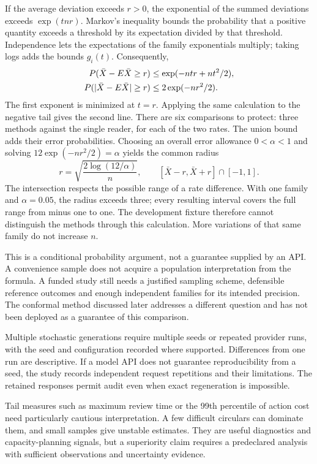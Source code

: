 If the average deviation exceeds $r>0$, the exponential of the summed deviations
exceeds $\exp(tnr)$. Markov's inequality bounds the probability that a positive
quantity exceeds a threshold by its expectation divided by that threshold.
Independence lets the expectations of the family exponentials multiply; taking
logs adds the bounds $g_i(t)$. Consequently,
\begin{align}
 P(\bar X-E\bar X\geq r)
 &\leq \exp(-ntr+nt^2/2),\notag\\
 P(|\bar X-E\bar X|\geq r)
 &\leq 2\exp(-nr^2/2).
 \label{eq:family-tail}
\end{align}
The first exponent is minimized at $t=r$. Applying the same calculation to the
negative tail gives the second line. There are six comparisons to protect:
three methods against the single reader, for each of the two rates. The union
bound adds their error probabilities. Choosing an overall error allowance
$0<\alpha<1$ and solving $12\exp(-nr^2/2)=\alpha$ yields the common radius
\begin{equation}
 r=\sqrt{\frac{2\log(12/\alpha)}{n}},\qquad
 [\bar X-r,\bar X+r]\cap[-1,1].
 \label{eq:family-interval}
\end{equation}
The intersection respects the possible range of a rate difference. With one
family and $\alpha=0.05$, the radius exceeds three; every resulting interval
covers the full range from minus one to one. The development fixture therefore
cannot distinguish the methods through this calculation. More variations of
that same family do not increase $n$.

This is a conditional probability argument, not a guarantee supplied by an
API. A convenience sample does not acquire a population interpretation from
the formula. A funded study still needs a justified sampling scheme, defensible
reference outcomes and enough independent families for its intended precision.
The conformal method discussed later addresses a different question and has
not been deployed as a guarantee of this comparison.


Multiple stochastic generations require multiple seeds or repeated provider runs,
with the seed and configuration recorded where supported. Differences from one
run are descriptive. If a model API does not guarantee reproducibility from a
seed, the study records independent request repetitions and their limitations.
The retained responses permit audit even when exact regeneration is impossible.

Tail measures such as maximum review time or the 99th percentile of action cost
need particularly cautious interpretation. A few difficult circulars can dominate
them, and small samples give unstable estimates. They are useful diagnostics and
capacity-planning signals, but a superiority claim requires a predeclared analysis
with sufficient observations and uncertainty evidence.

